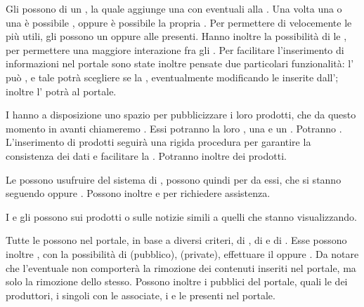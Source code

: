 Gli  possono  di un , la quale aggiunge una  con eventuali  alla . Una volta  una  o una  è possibile , oppure è possibile  la propria . 
Per permettere di  velocemente le  più utili, gli  possono  un   oppure  alle  presenti. Hanno inoltre la possibilità di  le , per permettere una maggiore interazione fra gli .
Per facilitare l'inserimento di informazioni nel portale sono state inoltre pensate due particolari funzionalità: l' può , e tale  potrà scegliere se  la , eventualmente modificando le  inserite dall'; inoltre l' potrà  al portale.

I  hanno a disposizione uno spazio per pubblicizzare i loro prodotti, che da questo momento in avanti chiameremo . Essi potranno  la loro ,  una  e un . Potranno . L'inserimento di prodotti seguirà una rigida procedura per garantire la consistenza dei dati e facilitare la . Potranno inoltre  dei prodotti.

\bigskip
Le  possono usufruire del sistema di , possono quindi  per  da essi,  che si stanno seguendo oppure . Possono inoltre  e   per richiedere assistenza.

I  e gli  possono  sui prodotti o sulle notizie simili a quelli che stanno visualizzando. 

Tutte le  possono  nel portale, in base a diversi criteri, di , di  e di .
Esse possono inoltre , con la possibilità di  (pubblico),  (private), effettuare il  oppure . Da notare che l'eventuale  non comporterà la rimozione dei contenuti inseriti nel portale, ma solo la rimozione dello stesso. Possono inoltre  i  pubblici del portale, quali le  dei produttori, i singoli  con le  associate, i  e le  presenti nel portale.

